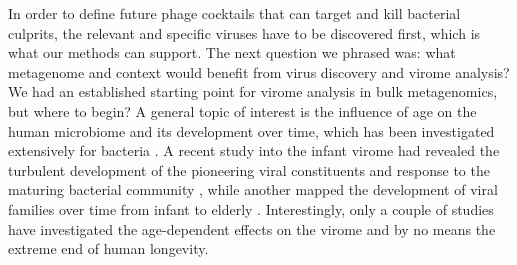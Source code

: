 \noindent
In order to define future phage cocktails that can target and kill bacterial culprits, the relevant and specific viruses have to be discovered first, which is what our methods can support. The next question we phrased was: what metagenome and context would benefit from virus discovery and virome analysis? We had an established starting point for virome analysis in bulk metagenomics, but where to begin? A general topic of interest is the influence of age on the human microbiome and its development over time, which has been investigated extensively for bacteria \cite{Stewart2018-vm,Ghosh2022-vc}. A recent study into the infant virome had revealed the turbulent development of the pioneering viral constituents and response to the maturing bacterial community \cite{Liang2020-lr}, while another mapped the development of viral families over time from infant to elderly \cite{Gregory2020-gu}. Interestingly, only a couple of studies have investigated the age-dependent effects on the virome and by no means the extreme end of human longevity.